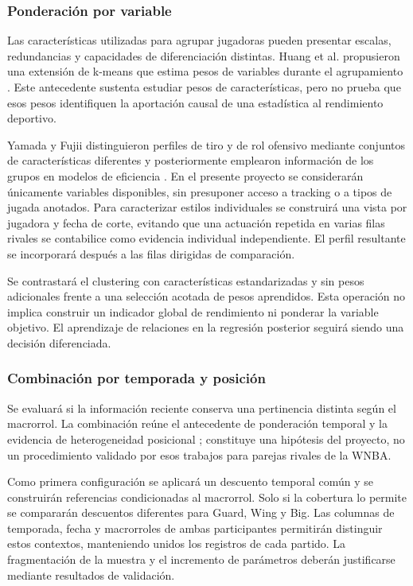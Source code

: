 \subsubsection{Ponderación por variable}
\label{subsubsec:ponderacion-variable}
Las características utilizadas para agrupar jugadoras pueden presentar escalas, redundancias y capacidades de diferenciación distintas. Huang et al. propusieron una extensión de k-means que estima pesos de variables durante el agrupamiento \cite{huang2005variableweighting}. Este antecedente sustenta estudiar pesos de características, pero no prueba que esos pesos identifiquen la aportación causal de una estadística al rendimiento deportivo.

Yamada y Fujii distinguieron perfiles de tiro y de rol ofensivo mediante conjuntos de características diferentes y posteriormente emplearon información de los grupos en modelos de eficiencia \cite{yamada2024offensivelineupanalysisbasketball}. En el presente proyecto se considerarán únicamente variables disponibles, sin presuponer acceso a tracking o a tipos de jugada anotados. Para caracterizar estilos individuales se construirá una vista por jugadora y fecha de corte, evitando que una actuación repetida en varias filas rivales se contabilice como evidencia individual independiente. El perfil resultante se incorporará después a las filas dirigidas de comparación.

Se contrastará el clustering con características estandarizadas y sin pesos adicionales frente a una selección acotada de pesos aprendidos. Esta operación no implica construir un indicador global de rendimiento ni ponderar la variable objetivo. El aprendizaje de relaciones en la regresión posterior seguirá siendo una decisión diferenciada.

\subsubsection{Combinación por temporada y posición}
\label{subsubsec:ponderacion-temporada-posicion}
Se evaluará si la información reciente conserva una pertinencia distinta según el macrorrol. La combinación reúne el antecedente de ponderación temporal y la evidencia de heterogeneidad posicional \cite{dixon1997scores,gomez2007posicioneswnba}; constituye una hipótesis del proyecto, no un procedimiento validado por esos trabajos para parejas rivales de la WNBA.

Como primera configuración se aplicará un descuento temporal común y se construirán referencias condicionadas al macrorrol. Solo si la cobertura lo permite se compararán descuentos diferentes para Guard, Wing y Big. Las columnas de temporada, fecha y macrorroles de ambas participantes permitirán distinguir estos contextos, manteniendo unidos los registros de cada partido. La fragmentación de la muestra y el incremento de parámetros deberán justificarse mediante resultados de validación.


